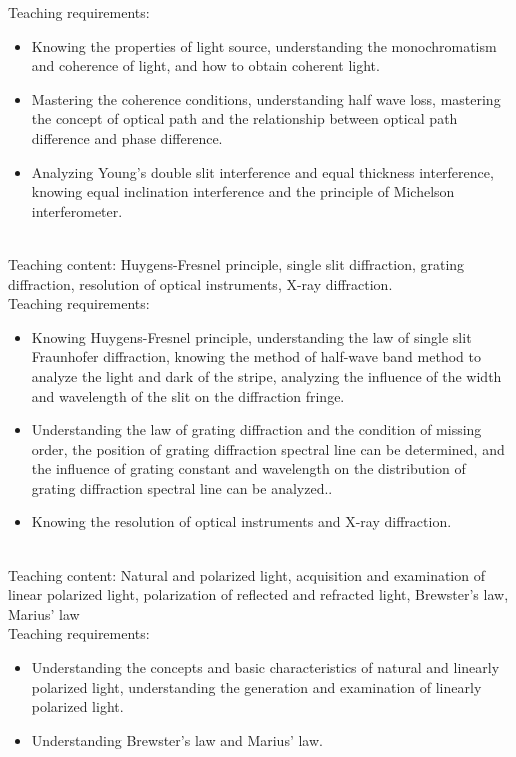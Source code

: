 \documentclass[10pt,a4paper,oneside]{article}
\begin{document}
Teaching requirements:
\begin{itemize}
	\item Knowing the properties of light source, understanding the monochromatism and coherence of light, and how to obtain coherent light.
	\item Mastering the coherence conditions, understanding half wave loss, mastering the concept of optical path and the relationship between optical path difference and phase difference.
	\item Analyzing Young's double slit interference and equal thickness interference, knowing equal inclination interference and the principle of Michelson interferometer.
\end{itemize}
\\

Teaching content: Huygens-Fresnel principle, single slit diffraction, grating diffraction, resolution of optical instruments, X-ray diffraction.\\

Teaching requirements:
\begin{itemize}
	\item Knowing Huygens-Fresnel principle, understanding the law of single slit Fraunhofer diffraction, knowing the method of half-wave band method to analyze the light and dark of the stripe, analyzing the influence of the width and wavelength of the slit on the diffraction fringe.
	\item Understanding the law of grating diffraction and the condition of missing order, the position of grating diffraction spectral line can be determined, and the influence of grating constant and wavelength on the distribution of grating diffraction spectral line can be analyzed..
	\item Knowing the resolution of optical instruments and X-ray diffraction.
\end{itemize}
\\

Teaching content: Natural and polarized light, acquisition and examination of linear polarized light, polarization of reflected and refracted light, Brewster's law, Marius' law\\

Teaching requirements:
\begin{itemize}
	\item Understanding the concepts and basic characteristics of natural and linearly polarized light, understanding the generation and examination of linearly polarized light.
	\item Understanding Brewster's law and Marius' law.
\end{itemize}
\end{document}

